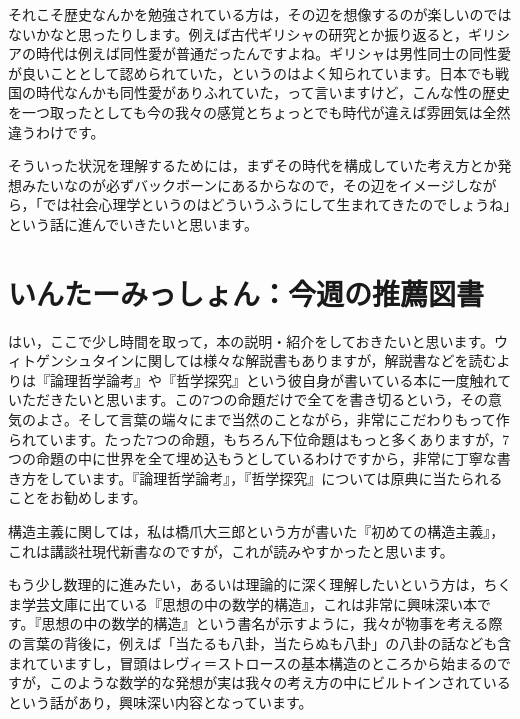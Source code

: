 \documentclass{ltjsbook}
\begin{document}
それこそ歴史なんかを勉強されている方は，その辺を想像するのが楽しいのではないかなと思ったりします。例えば古代ギリシャの研究とか振り返ると，ギリシアの時代は例えば同性愛が普通だったんですよね。ギリシャは男性同士の同性愛が良いこととして認められていた，というのはよく知られています。日本でも戦国の時代なんかも同性愛がありふれていた，って言いますけど，こんな性の歴史を一つ取ったとしても今の我々の感覚とちょっとでも時代が違えば雰囲気は全然違うわけです。

そういった状況を理解するためには，まずその時代を構成していた考え方とか発想みたいなのが必ずバックボーンにあるからなので，その辺をイメージしながら，「では社会心理学というのはどういうふうにして生まれてきたのでしょうね」という話に進んでいきたいと思います。

\section*{いんたーみっしょん：今週の推薦図書}

はい，ここで少し時間を取って，本の説明・紹介をしておきたいと思います。ウィトゲンシュタインに関しては様々な解説書もありますが，解説書などを読むよりは『論理哲学論考』や『哲学探究』という彼自身が書いている本に一度触れていただきたいと思います。この7つの命題だけで全てを書き切るという，その意気のよさ。そして言葉の端々にまで当然のことながら，非常にこだわりもって作られています。たった7つの命題，もちろん下位命題はもっと多くありますが，7つの命題の中に世界を全て埋め込もうとしているわけですから，非常に丁寧な書き方をしています。『論理哲学論考』，『哲学探究』については原典に当たられることをお勧めします。

構造主義に関しては，私は橋爪大三郎という方が書いた『初めての構造主義』\parencite{Hasidume1988}，これは講談社現代新書なのですが，これが読みやすかったと思います。

もう少し数理的に進みたい，あるいは理論的に深く理解したいという方は，ちくま学芸文庫に出ている『思想の中の数学的構造』\parencite{MasoYamashita2006}，これは非常に興味深い本です。『思想の中の数学的構造』という書名が示すように，我々が物事を考える際の言葉の背後に，例えば「当たるも八卦，当たらぬも八卦」の八卦の話なども含まれていますし，冒頭はレヴィ＝ストロースの基本構造のところから始まるのですが，このような数学的な発想が実は我々の考え方の中にビルトインされているという話があり，興味深い内容となっています。
\end{document}
